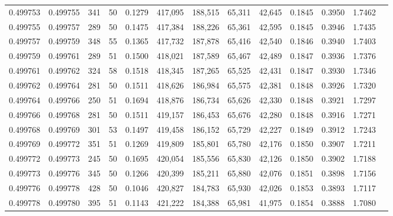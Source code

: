 \begin{tabular}{rrrrrrrrrrrrr}
0.499753 & 0.499755 & 341 &  50 &                                     0.1279 & 417,095 & 188,515 &  65,311 &  42,645 & 0.1845 & 0.3950 & 1.7462 \\
0.499755 & 0.499757 & 289 &  50 &                                     0.1475 & 417,384 & 188,226 &  65,361 &  42,595 & 0.1845 & 0.3946 & 1.7435 \\
0.499757 & 0.499759 & 348 &  55 &                                     0.1365 & 417,732 & 187,878 &  65,416 &  42,540 & 0.1846 & 0.3940 & 1.7403 \\
0.499759 & 0.499761 & 289 &  51 &                                     0.1500 & 418,021 & 187,589 &  65,467 &  42,489 & 0.1847 & 0.3936 & 1.7376 \\
0.499761 & 0.499762 & 324 &  58 &                                     0.1518 & 418,345 & 187,265 &  65,525 &  42,431 & 0.1847 & 0.3930 & 1.7346 \\
0.499762 & 0.499764 & 281 &  50 &                                     0.1511 & 418,626 & 186,984 &  65,575 &  42,381 & 0.1848 & 0.3926 & 1.7320 \\
0.499764 & 0.499766 & 250 &  51 &                                     0.1694 & 418,876 & 186,734 &  65,626 &  42,330 & 0.1848 & 0.3921 & 1.7297 \\
0.499766 & 0.499768 & 281 &  50 &                                     0.1511 & 419,157 & 186,453 &  65,676 &  42,280 & 0.1848 & 0.3916 & 1.7271 \\
0.499768 & 0.499769 & 301 &  53 &                                     0.1497 & 419,458 & 186,152 &  65,729 &  42,227 & 0.1849 & 0.3912 & 1.7243 \\
0.499769 & 0.499772 & 351 &  51 &                                     0.1269 & 419,809 & 185,801 &  65,780 &  42,176 & 0.1850 & 0.3907 & 1.7211 \\
0.499772 & 0.499773 & 245 &  50 &                                     0.1695 & 420,054 & 185,556 &  65,830 &  42,126 & 0.1850 & 0.3902 & 1.7188 \\
0.499773 & 0.499776 & 345 &  50 &                                     0.1266 & 420,399 & 185,211 &  65,880 &  42,076 & 0.1851 & 0.3898 & 1.7156 \\
0.499776 & 0.499778 & 428 &  50 &                                     0.1046 & 420,827 & 184,783 &  65,930 &  42,026 & 0.1853 & 0.3893 & 1.7117 \\
0.499778 & 0.499780 & 395 &  51 &                                     0.1143 & 421,222 & 184,388 &  65,981 &  41,975 & 0.1854 & 0.3888 & 1.7080 \\

\end{tabular}
